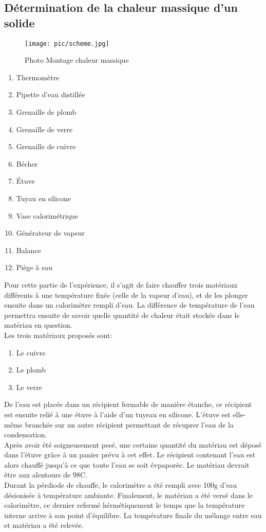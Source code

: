 \subsection{Détermination de la chaleur massique d'un solide}

\begin{figure}[!h]
    \centering
    \caption{Photo Montage chaleur massique}
    \texttt{[image: pic/scheme.jpg]}
\end{figure}
\begin{enumerate}
    \item{Thermomètre}
    \item{Pipette d'eau distillée}
    \item{Grenaille de plomb}
    \item{Grenaille de verre}
    \item{Grenaille de cuivre}
    \item{Bécher}
    \item{Étuve}
    \item{Tuyau en silicone}
    \item{Vase calorimétrique}
    \item{Générateur de vapeur}
    \item{Balance}
    \item{Piège à eau}
\end{enumerate}

Pour cette partie de l'expérience, il s'agit de faire chauffer trois matériaux différents à une température fixée (celle de la vapeur d'eau), et de les plonger ensuite dans un calorimètre rempli d'eau. La différence de température de l'eau permettra ensuite de savoir quelle quantité de chaleur était stockée dans le matériau en question.\\
\newpage
Les trois matériaux proposés sont:
\begin{enumerate}
    \item{Le cuivre}
    \item{Le plomb}
    \item{Le verre}
\end{enumerate}
De l'eau est placée dans un récipient fermable de manière étanche, ce récipient est ensuite relié à une étuve à l'aide d'un tuyeau en silicone. L'étuve est elle-même branchée sur un autre récipient permettant de récuprer l'eau de la condensation.\\
Après avoir été soigneusement pesé, une certaine quantité du matériau est déposé dans l'étuve grâce à un panier prévu à cet effet. Le récipient contenant l'eau est alors chauffé jusqu'à ce que toute l'eau se soit évpaporée. Le matériau devrait être aux alentours de 98C\degree.\\
Durant la pérdiode de chauffe, le calorimètre a été rempli avec 100g d'eau désionisée à température ambiante.
Finalement, le matériau a été versé dans le calorimètre, ce dernier refermé hérmétiquement le temps que la température interne arrive à son point d'équilibre.
La température finale du mélange entre eau et matériau a été relevée.


